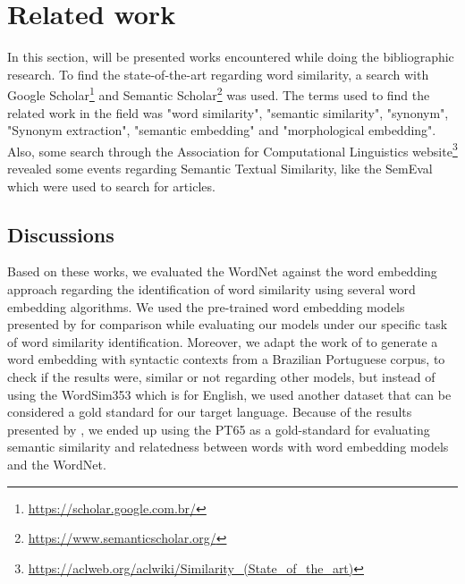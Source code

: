 




\section{Related work}\label{chap:relatedwork}

In this section, will be presented works encountered while doing the bibliographic research. To find the state-of-the-art regarding word similarity, a search with Google Scholar\footnote{\url{https://scholar.google.com.br/}} and Semantic Scholar\footnote{\url{https://www.semanticscholar.org/}} was used. The terms used to find the related work in the field was "word similarity", "semantic similarity", "synonym", "Synonym extraction", "semantic embedding" and "morphological embedding". Also, some search through the Association for Computational Linguistics website\footnote{\url{https://aclweb.org/aclwiki/Similarity_(State_of_the_art)}} revealed some events regarding Semantic Textual Similarity, like the SemEval which were used to search for articles.










\subsection{Discussions}

Based on these works, we evaluated the WordNet against the word embedding approach regarding the identification of word similarity using several word embedding algorithms. 
We used the pre-trained word embedding models presented by  for comparison while evaluating our models under our specific task of word similarity identification.
Moreover, we adapt the work of  to generate a word embedding with syntactic contexts from a Brazilian Portuguese corpus, to check if the results were, similar or not regarding other models, but instead of using the WordSim353 which is for English, we used another dataset that can be considered a gold standard for our target language.
Because of the results presented by , we ended up using the PT65 as a gold-standard for evaluating semantic similarity and relatedness between words with word embedding models and the WordNet. 

